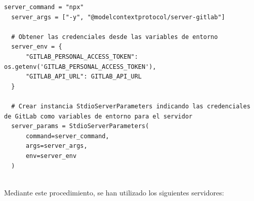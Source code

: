 \begin{lstlisting}[caption={\protect\opus{mcp_multi_client.py}: instanciado de StdioServerParameters para el servidor MCP de GitLab},label={lst:mcpgitlab}]
  server_command = "npx"
  server_args = ["-y", "@modelcontextprotocol/server-gitlab"]

  # Obtener las credenciales desde las variables de entorno
  server_env = {
      "GITLAB_PERSONAL_ACCESS_TOKEN": os.getenv('GITLAB_PERSONAL_ACCESS_TOKEN'),
      "GITLAB_API_URL": GITLAB_API_URL
  }

  # Crear instancia StdioServerParameters indicando las credenciales de GitLab como variables de entorno para el servidor
  server_params = StdioServerParameters(
      command=server_command,
      args=server_args,
      env=server_env
  )
  
\end{lstlisting}
Mediante este procedimiento, se han utilizado los siguientes servidores:
